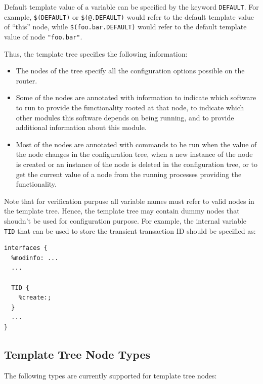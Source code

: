 \documentclass[11pt]{article}
\begin{document}
Default template value of a variable can be specified by the keyword
{\tt DEFAULT}. For example, {\tt \$(DEFAULT)} or {\tt \$(@.DEFAULT)}
would refer to the default template value of ``this'' node, while
{\tt \$(foo.bar.DEFAULT)} would refer to the default template value
of node {\tt "foo.bar"}.

Thus, the template tree specifies the following information:

\begin{itemize}

  \item The nodes of the tree specify all the configuration options
  possible on the router.

  \item Some of the nodes are annotated with information to indicate
  which software to run to provide the functionality rooted at that
  node, to indicate which other modules this software depends on
  being running, and to provide additional information about this module.

  \item Most of the nodes are annotated with commands to be run when the
  value of the node changes in the configuration tree, when a new
  instance of the node is created or an instance of the node is deleted
  in the configuration tree, or to get the current value of a node from
  the running processes providing the functionality.

\end{itemize}

Note that for verification purpuse all variable names must refer to valid
nodes in the template tree. Hence, the template tree may contain dummy nodes
that shoudn't be used for configuration purpose. For example, the internal
variable {\tt TID} that can be used to store the transient transaction ID
should be specified as:

\begin{verbatim}
interfaces {
  %modinfo: ...
  ...

  TID {
    %create:;
  }
  ...
}

\end{verbatim}

\subsection{Template Tree Node Types}

The following types are currently supported for template tree nodes:
\end{document}
